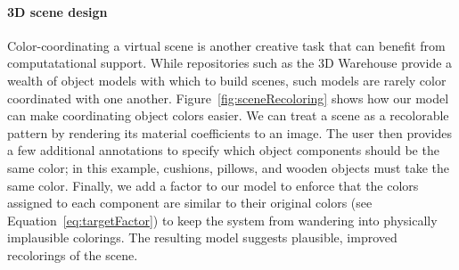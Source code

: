 \paragraph{3D scene design}
Color-coordinating a virtual scene is another creative task that can benefit from computatational support. While repositories such as the 3D Warehouse provide a wealth of object models with which to build scenes, such models are rarely color coordinated with one another. Figure~\ref{fig:sceneRecoloring} shows how our model can make coordinating object colors easier. We can treat a scene as a recolorable pattern by rendering its material coefficients to an image. The user then provides a few additional annotations to specify which object components should be the same color; in this example, cushions, pillows, and wooden objects must take the same color. Finally, we add a factor to our model to enforce that the colors assigned to each component are similar to their original colors (see Equation~\ref{eq:targetFactor}) to keep the system from wandering into physically implausible colorings. The resulting model suggests plausible, improved recolorings of the scene.

